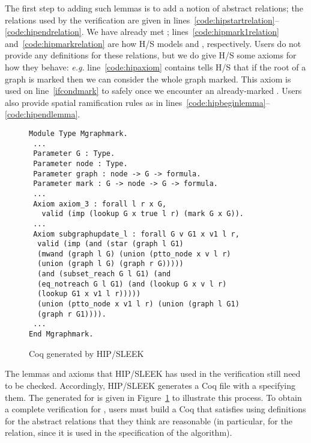 The first step to adding such lemmas is to add a notion of abstract relations; the relations used by the  verification are given in lines~\ref{code:hipstartrelation}--\ref{code:hipendrelation}.  We have already met ; lines~\ref{code:hipmark1relation} and~\ref{code:hipmarkrelation} are how H/S models  and , respectively.  Users do not provide any definitions for these relations, but we do give H/S some axioms for how they behave: \emph{e.g.} line~\ref{code:hipaxiom} contains tells H/S that if the root of a graph is marked then we can consider the whole graph marked.  This axiom is used on line~\ref{ifcondmark} to safely  once we encounter an already-marked .  Users also provide spatial ramification rules as in lines~\ref{code:hipbeginlemma}--\ref{code:hipendlemma}.  %

\begin{figure}[t]
  \begin{lstlisting}
Module Type Mgraphmark.
 ...
 Parameter G : Type.
 Parameter node : Type.
 Parameter graph : node -> G -> formula.
 Parameter mark : G -> node -> G -> formula.
 ...
 Axiom axiom_3 : forall l r x G,
   valid (imp (lookup G x true l r) (mark G x G)).
 ...
 Axiom subgraphupdate_l : forall G v G1 x v1 l r,
  valid (imp (and (star (graph l G1)
  (mwand (graph l G) (union (ptto_node x v l r)
  (union (graph l G) (graph r G)))))
  (and (subset_reach G l G1) (and
  (eq_notreach G l G1) (and (lookup G x v l r)
  (lookup G1 x v1 l r)))))
  (union (ptto_node x v1 l r) (union (graph l G1)
  (graph r G1)))).
 ...
End Mgraphmark.
\end{lstlisting}
\caption{Coq  generated by HIP/SLEEK}
\label{fig:hipcoqfile}
\end{figure}

The lemmas and axioms that HIP/SLEEK has used in the verification still need to be checked.  Accordingly, HIP/SLEEK generates a Coq file with a  specifying them.  The  generated for  is given in Figure~\ref{fig:hipcoqfile} to illustrate this process.  To obtain a complete verification for , users must build a Coq  that satisfies  using definitions for the abstract relations that they think are reasonable (in particular, for the  relation, since it is used in the specification of the algorithm).


